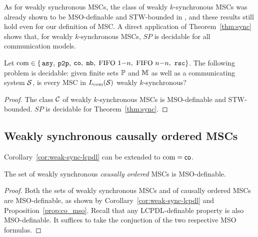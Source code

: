 As for weakly synchronous MSCs, the class of weakly $k$-synchronous MSCs was already shown to be MSO-definable and STW-bounded in \cite{BolligFG21}, and these results still hold even for our definition of MSC. A direct application of Theorem~\ref{thm:sync} shows that, for weakly $k$-synchronous MSCs, $SP$ is decidable for all communication models.

\begin{proposition}\label{thm:weak-k-sync}
	Let $\textup{com} \in \{$$\mathtt{asy}, $ $\mathtt{p2p}, $ $\mathtt{co}, $ $\mathtt{mb}, $ $\text{FIFO } 1\mathsf{-}n, $ $\text{FIFO } n\mathsf{-}n, $ $\mathtt{rsc}\}$.
	The following problem is decidable:
	given finite sets $\mathbb{P}$ and $\mathbb{M}$ as well as a communicating system $\mathcal{S}$,
	is every MSC in $L_{\textup{com}}(\mathcal{S})$ weakly $k$-synchronous?
\end{proposition}
\begin{proof}
	The class $\mathcal{C}$ of weakly $k$-synchronous MSCs is MSO-definable and STW-bounded. $SP$ is decidable for Theorem~\ref{thm:sync}.
\end{proof}


\subsection{Weakly synchronous causally ordered MSCs}

Corollary~\ref{cor:weak-sync-lcpdl} can  be extended to $\textup{com} = \mathsf{co}$.

\begin{proposition}\label{cor:co-weak-sync-mso}
The set of weakly synchronous \emph{causally ordered} MSCs is MSO-definable.
\end{proposition}
\begin{proof}
Both the sets of weakly synchronous MSCs and of causally ordered MSCs are MSO-definable, as shown by Corollary~\ref{cor:weak-sync-lcpdl} and Proposition~\ref{prop:co_mso}. Recall that any LCPDL-definable property is also MSO-definable. It suffices to take the conjuction of the two respective MSO formulas.
\end{proof}

